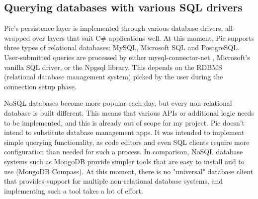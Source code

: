\subsection{Querying databases with various SQL drivers}

Pie's persistence layer is implemented through various database drivers, all wrapped over layers that suit C\# applications well. At this moment, Pie supports three types of relational databases: MySQL, Microsoft SQL and PostgreSQL. User-submitted queries are processed by either mysql-connector-net \cite{mysql-driver}, Microsoft's vanilla SQL driver, or the Npgsql \cite{npgsql-driver} library. This depends on the RDBMS (relational database management system) picked by the user during the connection setup phase.

NoSQL databases become more popular each day, but every non-relational database is built different. This means that various APIs or additional logic needs to be implemented, and this is already out of scope for my project. Pie doesn't intend to substitute database management apps. It was intended to implement simple querying functionality, as code editors and even SQL clients require more configuration than needed for such a process. In comparison, NoSQL database systems such as MongoDB provide simpler tools that are easy to install and to use (MongoDB Compass). At this moment, there is no "universal" database client that provides support for multiple non-relational database systems, and implementing such a tool takes a lot of effort.